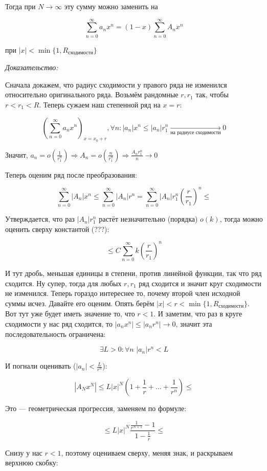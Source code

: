 \documentclass{article}
\def\dbl{\,\,}
\begin{document}
Тогда при $N \rightarrow \infty$ эту сумму можно заменить на

\[\sum_{n = 0}^{\infty} a_n x^n = (1 - x)\sum_{n = 0}^{\infty} A_n x^n\]

при $|x| < \min \{1, R_{\text{сходимости}}\}$

\textit{Доказательство:}

Сначала докажем, что радиус сходимости у правого ряда не изменился относительно оригинального ряда. Возьмём рандомные $r, r_1$ так, чтобы $r < r_1 < R$. Теперь сужаем наш степенной ряд на $x = r$:

\[\left(\sum_{n = 0}^{\infty} a_n x^n\right)_{x = x_0 + r}, \forall n: |a_n|x^n \le |a_n|r^n_{1} \underset{\text{на радиусе сходимости}}{\longrightarrow} 0\]

Значит, $a_n = o(\frac{1}{r^n_{1}}) \Rightarrow A_n = o(\frac{n}{r^n_1}) \Rightarrow \frac{A_nr^n_{1}}{n} \rightarrow 0$

Теперь оценим ряд после преобразования:

\[\sum_{n = 0}^{\infty} |A_n| x^n \le \sum_{n = 0}^{\infty} |A_n| r^n = \sum_{n = 0}^{\infty} |A_n|r^n_{1} \left(\frac{r}{r_{1}}\right)^n \le\]

Утверждается, что раз $|A_n|r^n_1$ растёт незначительно (порядка) $o(k)$, тогда можно оценить сверху константой (???): 

\[\le C \sum_{n = 0}^{\infty}k \left(\frac{r}{r_1}\right)^{n}\]

И тут дробь, меньшая единицы в степени, против линейной функции, так что ряд сходится. Ну супер, тогда для любых $r, r_1$ ряд сходится и значит круг сходимости не изменился. Теперь гораздо интереснее то, почему второй член исходной суммы исчез. Давайте его оценим. Опять берём $|x| < r < \min\{1, R_{\text{сходимости}}\}$. Вот тут уже будет иметь значение то, что $r < 1$. И заметим, что раз в круге сходимости у нас ряд сходится, то $|a_nx^n| \le |a_nr^n| \rightarrow 0$, значит эта последовательность ограничена:

\[\exists L > 0: \forall n \dbl |a_n|r^n < L\]

И погнали оценивать ($|a_n| < \frac{L}{r^n}$):

\[|A_Nx^N| \le L|x|^N\left(1 + \frac{1}{r} + \ldots + \frac{1}{r^n}\right) \le\]

Это --- геометрическая прогрессия, заменяем по формуле: 

\[\le L|x|^N\frac{\frac{1}{r^{N + 1}} - 1}{1 - \frac{1}{r}} \le\]

Снизу у нас $r < 1$, поэтому оцениваем сверху, меняя знак, и раскрываем верхнюю скобку: 
\end{document}
